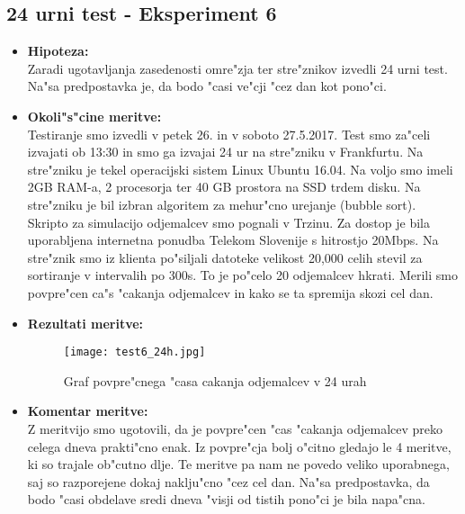 \subsection{24 urni test - Eksperiment 6}
\begin{itemize}
	\item \textbf{Hipoteza: }  \\
		Zaradi ugotavljanja zasedenosti omre"zja ter stre"znikov izvedli 24 urni test. Na"sa predpostavka je, da bodo "casi ve"cji "cez dan kot pono"ci.
			
	\item \textbf{Okoli"s"cine meritve: } \\
		Testiranje smo izvedli v petek 26. in v soboto 27.5.2017. Test smo za"celi izvajati ob 13:30 in smo ga izvajai 24 ur na stre"zniku v Frankfurtu. Na stre"zniku je tekel operacijski sistem Linux Ubuntu 16.04. Na voljo smo imeli 2GB RAM-a, 2 procesorja ter 40 GB prostora na SSD trdem disku. Na stre"zniku je bil izbran algoritem za mehur"cno urejanje (bubble sort). Skripto za simulacijo odjemalcev smo pognali v Trzinu. Za dostop je bila uporabljena internetna ponudba Telekom Slovenije s hitrostjo 20Mbps. Na stre"znik smo iz klienta po"siljali datoteke velikost 20,000 celih stevil za sortiranje v intervalih po 300s. To je po"celo 20 odjemalcev hkrati. Merili smo povpre"cen ca"s "cakanja odjemalcev in kako se ta spremija skozi cel dan. 

 	\item \textbf{Rezultati meritve: }  \\
		\begin{figure}[h]
  		\centering
  		  \texttt{[image: test6\_24h.jpg]}
  		\caption{Graf povpre"cnega "casa cakanja odjemalcev v 24 urah }
  		\label{8_graf_racunska_moc_50}
		\end{figure}

	\item \textbf{Komentar meritve: } \\ 
		Z meritvijo smo ugotovili, da je povpre"cen "cas "cakanja odjemalcev preko celega dneva prakti"cno enak. Iz povpre"cja bolj o"citno gledajo le 4 meritve, ki so trajale ob"cutno dlje. Te meritve pa nam ne povedo veliko uporabnega, saj so razporejene dokaj naklju"cno "cez cel dan. Na"sa predpostavka, da bodo "casi obdelave sredi dneva "visji od tistih pono"ci je bila napa"cna. 


\end{itemize}

	



